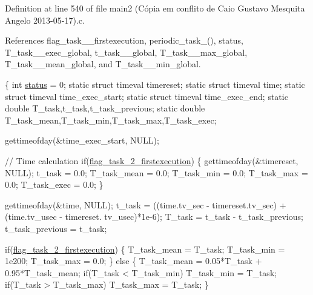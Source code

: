 Definition at line 540 of file main2 (\-Cópia em conflito de Caio Gustavo Mesquita Angelo 2013-\/05-\/17).\-c.



References flag\-\_\-task\-\_\-\_\-firstexecution, periodic\-\_\-task\-\_(), status, T\-\_\-task\-\_\-\_\-exec\-\_\-global, t\-\_\-task\-\_\-\_\-global, T\-\_\-task\-\_\-\_\-max\-\_\-global, T\-\_\-task\-\_\-\_\-mean\-\_\-global, and T\-\_\-task\-\_\-\_\-min\-\_\-global.


\begin{DoxyCode}
\{
    \textcolor{keywordtype}{int} \hyperlink{communication_01_07C_xC3_xB3pia_01em_01conflito_01de_01Andr_xC3_xA9_01Carvalho_012013-04-26_08_8c_a6e27f49150e9a14580fb313cc2777e00}{status} = 0;
    \textcolor{keyword}{static} \textcolor{keyword}{struct }timeval timereset;
    \textcolor{keyword}{static} \textcolor{keyword}{struct }timeval time;
    \textcolor{keyword}{static} \textcolor{keyword}{struct }timeval time\_exec\_start;
    \textcolor{keyword}{static} \textcolor{keyword}{struct }timeval time\_exec\_end;
    \textcolor{keyword}{static} \textcolor{keywordtype}{double} T\_task,t\_task,t\_task\_previous;
    \textcolor{keyword}{static} \textcolor{keywordtype}{double} T\_task\_mean,T\_task\_min,T\_task\_max,T\_task\_exec;

    gettimeofday(&time\_exec\_start, NULL);

    \textcolor{comment}{// Time calculation}
    \textcolor{keywordflow}{if}(\hyperlink{main2_01_07C_xC3_xB3pia_01em_01conflito_01de_01Caio_01Gustavo_01Mesquita_01Angelo_012013-04-28_08_8c_a60e039269ae4a130db1bdbc4a709c437}{flag\_task\_2\_firstexecution})
    \{
        gettimeofday(&timereset, NULL);
        t\_task = 0.0;
        T\_task\_mean = 0.0;
        T\_task\_min = 0.0;
        T\_task\_max = 0.0;
        T\_task\_exec = 0.0;
    \}

    gettimeofday(&time, NULL);
    t\_task = ((time.tv\_sec - timereset.tv\_sec) + (time.tv\_usec - timereset.
      tv\_usec)*1e-6);
    T\_task = t\_task - t\_task\_previous;
    t\_task\_previous = t\_task;

    \textcolor{keywordflow}{if}(\hyperlink{main2_01_07C_xC3_xB3pia_01em_01conflito_01de_01Caio_01Gustavo_01Mesquita_01Angelo_012013-04-28_08_8c_a60e039269ae4a130db1bdbc4a709c437}{flag\_task\_2\_firstexecution})
    \{
        T\_task\_mean = T\_task;
        T\_task\_min  = 1e200;
        T\_task\_max  = 0.0;
    \}
    \textcolor{keywordflow}{else}
    \{
        T\_task\_mean = 0.05*T\_task + 0.95*T\_task\_mean;
        \textcolor{keywordflow}{if}(T\_task < T\_task\_min) T\_task\_min  = T\_task;
        \textcolor{keywordflow}{if}(T\_task > T\_task\_max) T\_task\_max  = T\_task;
    \}


\end{DoxyCode}

